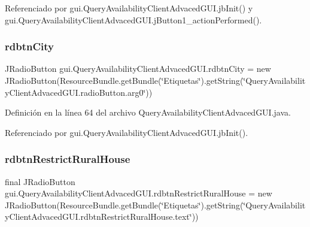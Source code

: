 Referenciado por gui.\+Query\+Availability\+Client\+Advaced\+G\+U\+I.\+jb\+Init() y gui.\+Query\+Availability\+Client\+Advaced\+G\+U\+I.\+j\+Button1\+\_\+action\+Performed().

\mbox{\label{classgui_1_1_query_availability_client_advaced_g_u_i_a5a0c4df2fff9b4342f7036d740f4a6f6}} 
\subsubsection{\texorpdfstring{rdbtnCity}{rdbtnCity}}
{\footnotesize\ttfamily J\+Radio\+Button gui.\+Query\+Availability\+Client\+Advaced\+G\+U\+I.\+rdbtn\+City = new J\+Radio\+Button(Resource\+Bundle.\+get\+Bundle(\char`\"{}Etiquetas\char`\"{}).get\+String(\char`\"{}Query\+Availability\+Client\+Advaced\+G\+U\+I.\+radio\+Button.\+arg0\char`\"{}))\hspace{0.3cm}{\ttfamily [private]}}



Definición en la línea 64 del archivo Query\+Availability\+Client\+Advaced\+G\+U\+I.\+java.



Referenciado por gui.\+Query\+Availability\+Client\+Advaced\+G\+U\+I.\+jb\+Init().

\mbox{\label{classgui_1_1_query_availability_client_advaced_g_u_i_a755a3dccd546ef1397ef0889652dd76a}} 
\subsubsection{\texorpdfstring{rdbtnRestrictRuralHouse}{rdbtnRestrictRuralHouse}}
{\footnotesize\ttfamily final J\+Radio\+Button gui.\+Query\+Availability\+Client\+Advaced\+G\+U\+I.\+rdbtn\+Restrict\+Rural\+House = new J\+Radio\+Button(Resource\+Bundle.\+get\+Bundle(\char`\"{}Etiquetas\char`\"{}).get\+String(\char`\"{}Query\+Availability\+Client\+Advaced\+G\+U\+I.\+rdbtn\+Restrict\+Rural\+House.\+text\char`\"{}))\hspace{0.3cm}{\ttfamily [private]}}



